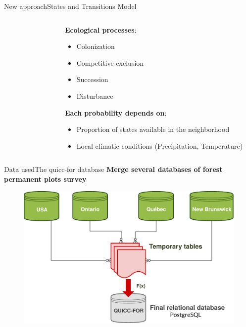\documentclass[10pt,aspectratio=149]{beamer}
\begin{document}

\begin{frame}{New approach}{States and Transitions Model}


\begin{columns}[c]
	\begin{column}[c]{.40\paperwidth}
		\begin{figure}
			\small{}
		\end{figure}
	\end{column}
	\begin{column}[l]{.50\paperwidth}
	\textbf{Ecological processes}:
	\begin{itemize}
		\item \alert<+>{Colonization}
		\item \alert<+>{Competitive exclusion}
		\item \alert<+>{Succession}
		\item \alert<+>{Disturbance}
	\end{itemize}
	\vspace{1em}
	\pause
	\textbf{Each probability depends on}:
		\begin{itemize}
			\item Proportion of states available in the neighborhood
			\item Local climatic conditions (Precipitation, Temperature)
		\end{itemize}
	\end{column}
\end{columns}

\end{frame}



\begin{frame}{Data used}{The quicc-for database}
	\vspace{-1em}
	\center \textbf{Merge several databases of forest permanent plots survey}
\begin{figure}
	\includegraphics[width=.70\paperwidth]{Figs/quiccfor.pdf}
\end{figure}

\end{frame}
\end{document}

